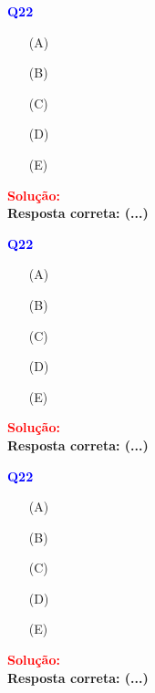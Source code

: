 \documentclass[a4paper,12pt]{article}
\begin{document}
\begin{flushleft}
\textbf{\textcolor{blue}{\Large Q22}}\\


\begin{itemize}
\item[(A)] 
\item[(B)]   
\item[(C)] 
\item[(D)] 
\item[(E)] 
\end{itemize}

\vspace{0.5cm}

\textcolor{red}{\textbf{Solução:}}\\

\textbf{Resposta correta: \colorbox{green!50}{(...)}}

\end{flushleft}

\begin{flushleft}
\textbf{\textcolor{blue}{\Large Q22}}\\


\begin{itemize}
\item[(A)] 
\item[(B)]   
\item[(C)] 
\item[(D)] 
\item[(E)] 
\end{itemize}

\vspace{0.5cm}

\textcolor{red}{\textbf{Solução:}}\\

\textbf{Resposta correta: \colorbox{green!50}{(...)}}

\end{flushleft}


\begin{flushleft}
\textbf{\textcolor{blue}{\Large Q22}}\\


\begin{itemize}
\item[(A)] 
\item[(B)]   
\item[(C)] 
\item[(D)] 
\item[(E)] 
\end{itemize}

\vspace{0.5cm}

\textcolor{red}{\textbf{Solução:}}\\

\textbf{Resposta correta: \colorbox{green!50}{(...)}}

\end{flushleft}
\end{document}
